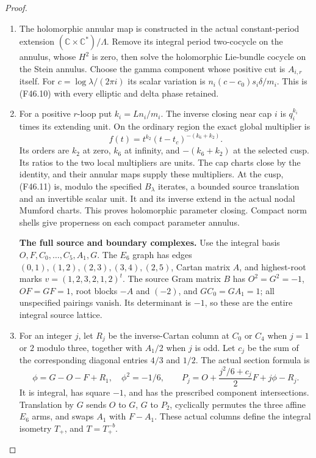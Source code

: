 \begin{proof}
\begin{enumerate}[label=\arabic*.]
\item The holomorphic annular map is constructed in the actual
constant-period extension $(\mathbb C\times\mathbb C^*)/\Lambda$.
Remove its integral period two-cocycle on the annulus, whose
$H^2$ is zero, then solve the holomorphic Lie-bundle cocycle
on the Stein annulus. Choose the gamma component whose positive
cut is $A_{i,r}$ itself. For $c=\log\lambda/(2\pi i)$ its scalar
variation is $n_i(c-c_0)s_i\delta/m_i$. This is (F46.10) with
every elliptic and delta phase retained.

\item For a positive $r$-loop put $k_i=Ln_i/m_i$. The inverse closing
near cap $i$ is $q_i^{k_i}$ times its extending unit. On the
ordinary region the exact global multiplier is
\[
                  f(t)=t^{k_2}(t-t_c)^{-(k_6+k_2)}.              \tag{F46.11}
\]
Its orders are $k_2$ at zero, $k_6$ at infinity, and
$-(k_6+k_2)$ at the selected cusp. Its ratios to the two local
multipliers are units. The cap charts close by the identity,
and their annular maps supply these multipliers. At the cusp,
(F46.11) is, modulo the specified $B_\lambda$ iterates, a bounded
source translation and an invertible scalar unit. It and its
inverse extend in the actual nodal Mumford charts. This proves
holomorphic parameter closing. Compact norm shells give
properness on each compact parameter annulus.

\par\medskip\noindent\textbf{The full source and boundary complexes.}
Use the integral basis $O,F,C_0,\ldots,C_5,A_1,G$.
The $E_6$ graph has edges
$(0,1),(1,2),(2,3),(3,4),(2,5)$, Cartan matrix $A$, and
highest-root marks $v=(1,2,3,2,1,2)^t$.
The source Gram matrix $B$ has $O^2=G^2=-1$, $OF=GF=1$,
root blocks $-A$ and $(-2)$, and $GC_0=GA_1=1$;
all unspecified pairings vanish. Its determinant is $-1$,
so these are the entire integral source lattice.

\item For an integer $j$, let $R_j$ be the inverse-Cartan column at
$C_0$ or $C_4$ when $j=1$ or $2$ modulo three, together
with $A_1/2$ when $j$ is odd. Let $c_j$ be the sum of the
corresponding diagonal entries $4/3$ and $1/2$.
The actual section formula is
\[
 \phi=G-O-F+R_1,\quad \phi^2=-1/6,\qquad
 P_j=O+\frac{j^2/6+c_j}{2}F+j\phi-R_j.                          \tag{F46.12}
\]
It is integral, has square $-1$, and has the prescribed component
intersections. Translation by $G$ sends $O$ to $G$, $G$ to
$P_2$, cyclically permutes the three affine $E_6$ arms, and
swaps $A_1$ with $F-A_1$. These actual columns define the
integral isometry $T_+$, and $T=T_+^{-b}$.


\end{enumerate}
\end{proof}
